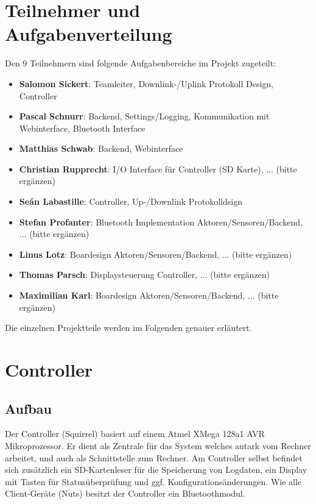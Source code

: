 \documentclass[12pt,a4paper]{article}
\begin{document}
\section{Teilnehmer und Aufgabenverteilung}

Den 9 Teilnehmern sind folgende Aufgabenbereiche im Projekt zugeteilt:\\

\begin{itemize}
	\item {\bf Salomon Sickert}: Teamleiter, Downlink-/Uplink Protokoll Design, Controller
	\item {\bf Pascal Schnurr}: Backend, Settings/Logging, Kommunikation mit Webinterface, Bluetooth Interface
	\item {\bf Matthias Schwab}: Backend, Webinterface
	\item {\bf Christian Rupprecht}: I/O Interface für Controller (SD Karte), ... (bitte ergänzen)
	\item {\bf Seán Labastille}: Controller, Up-/Downlink Protokolldsign
	\item {\bf Stefan Profanter}: Bluetooth Implementation Aktoren/Sensoren/Backend, ... (bitte ergänzen)
	\item {\bf Linus Lotz}: Boardesign Aktoren/Sensoren/Backend, ... (bitte ergänzen)
	\item {\bf Thomas Parsch}: Displaysteuerung Controller, ... (bitte ergänzen)
	\item {\bf Maximilian Karl}: Boardesign Aktoren/Sensoren/Backend, ... (bitte ergänzen)
\end{itemize}

Die einzelnen Projektteile werden im Folgenden genauer erläutert.

\section{Controller}

\subsection{Aufbau}

Der Controller (Squirrel) basiert auf einem Atmel XMega 128a1 AVR Mikroprozessor.
Er dient als Zentrale für das System welches autark vom Rechner arbeitet, und auch als Schnittstelle zum Rechner.
Am Controller selbst befindet sich zusätzlich ein SD-Kartenleser für die Speicherung von Logdaten, ein Display mit Tasten für Statusüberprüfung und ggf. Konfigurationsänderungen.
Wie alle Client-Geräte (Nuts) besitzt der Controller ein Bluetoothmodul.\\
\end{document}
